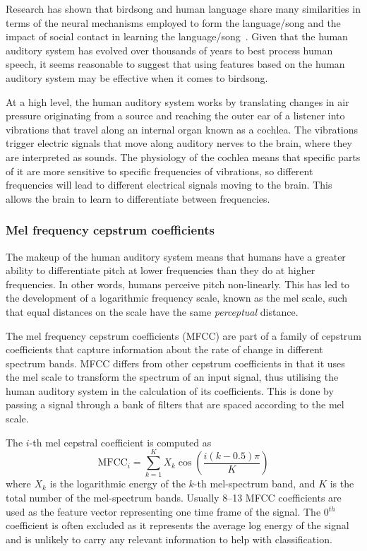 Research has shown that birdsong and human language share many similarities in
terms of the neural mechanisms employed to form the language/song and the impact
of social contact in learning the language/song~\cite{birdsongspeech}. Given that
the human auditory system has evolved over thousands of years to best process
human speech, it seems reasonable to suggest that using features based on the
human auditory system may be effective when it comes to birdsong.

At a high level, the human auditory system works by translating changes in air
pressure originating from a source and reaching the outer ear of a listener
into vibrations that travel along an internal organ known as a cochlea. The
vibrations trigger electric signals that move along auditory nerves to the
brain, where they are interpreted as sounds. The physiology of the cochlea
means that specific parts of it are more sensitive to specific frequencies
of vibrations, so different frequencies will lead to different electrical
signals moving to the brain. This allows the brain to learn to differentiate
between frequencies.

\subsubsection{Mel frequency cepstrum coefficients}

The makeup of the human auditory system means that humans have a greater ability
to differentiate pitch at lower frequencies than they do at higher frequencies.
In other words, humans perceive pitch non-linearly. This has led to the
development of a logarithmic frequency scale, known as the mel scale, such that
equal distances on the scale have the same \textit{perceptual} distance.

The mel frequency cepstrum coefficients (MFCC) are part of a family of cepstrum
coefficients that capture information about the rate of change in different
spectrum bands. MFCC differs from other cepstrum coefficients in that it uses the
mel scale to transform the spectrum of an input signal, thus utilising the human
auditory system in the calculation of its coefficients. This is done by passing
a signal through a bank of filters that are spaced according to the mel scale.

The $i$-th mel cepstral coefficient is computed as~\cite{davis1980comparison}
\begin{equation}
\text{MFCC}_i = \sum_{k=1}^{K} X_k \cos \left(
  \frac{i(k-0.5)\pi}{K}
\right)
\end{equation}
where $X_k$ is the logarithmic energy of the $k$-th mel-spectrum band, and $K$
is the total number of the mel-spectrum bands. Usually 8--13 MFCC coefficients
are used as the feature vector representing one time frame of the signal. The
0$^{th}$ coefficient is often excluded as it represents the average log energy
of the signal and is unlikely to carry any relevant information to help with
classification.

